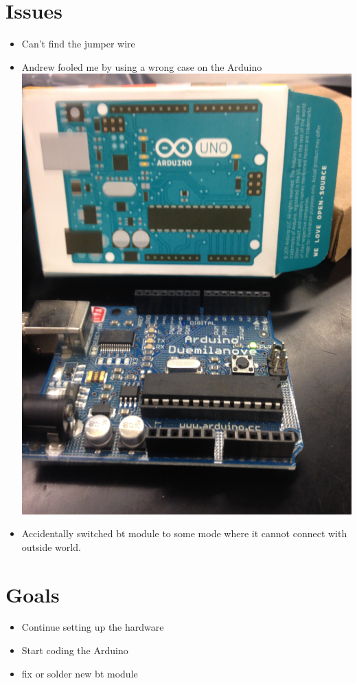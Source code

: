 \documentclass{article}
\begin{document}
\section{Issues}
\begin{itemize}
\item Can't find the jumper wire
\item Andrew fooled me by using a wrong case on the Arduino \\
\includegraphics[scale=0.1,angle=-90]{IMG_2845.JPG}
\item Accidentally switched bt module to some mode where it cannot connect with outside world.
\end{itemize}
\section{Goals}
\begin{itemize}
\item Continue setting up the hardware
\item Start coding the Arduino
\item fix or solder new bt module
\end{itemize}

\end{document}
